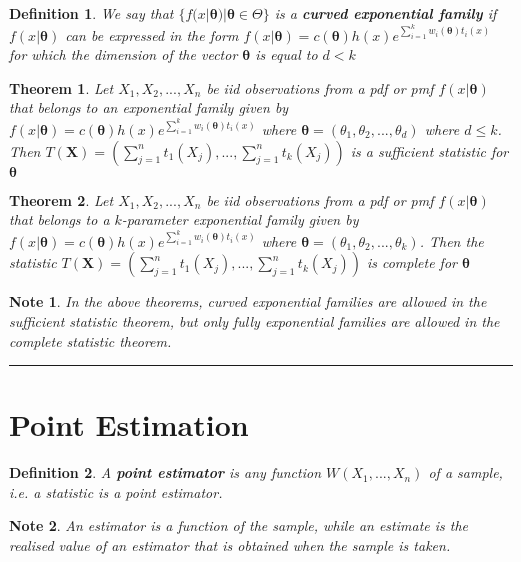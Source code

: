 \documentclass[14pt,twoside]{extreport}
\newcommand{\hhrule}{\vspace{1cm}\hrule\vspace{1cm}}
\theoremstyle{dotless}
\newtheorem*{defn}{\footnotesize Definition}
\newtheorem*{thm}{\footnotesize Theorem} %
\newtheorem*{note}{\footnotesize Note} %
\begin{document}
\begin{defn}
    We say that $\{ f(x|\bm{\theta}) | \bm{\theta} \in \Theta \}$ is a \textbf{curved exponential family} if $f(x|\bm{\theta})$ can be expressed in the form $f(x|\bm{\theta}) = c(\bm{\theta}) h(x) e^{\sum_{i=1}^k w_i(\bm{\theta}) t_i(x)}$ for which the dimension of the vector $\bm{\theta}$ is equal to $d < k$
\end{defn}

\begin{thm}
    Let $X_1, X_2, ...,  X_n$ be iid observations from a pdf or pmf $f(x|\bm{\theta})$ that belongs to an exponential family given by $f(x|\bm{\theta}) = c(\bm{\theta}) h(x) e^{\sum_{i=1}^k w_i(\bm{\theta}) t_i(x)}$ where $\bm{\theta} = (\theta_1, \theta_2, ..., \theta_d)$ where $d \leq k$. Then $T(\bm{X}) = \left (  \sum_{j=1}^n t_1(X_j), ..., \sum_{j=1}^n t_k(X_j) \right )$ is a sufficient statistic for $\bm{\theta}$
\end{thm}


\begin{thm}
    Let $X_1, X_2, ..., X_n$ be iid observations from a pdf or pmf $f(x|\bm{\theta})$ that belongs to a $k$-parameter exponential family given by $f(x|\bm{\theta}) = c(\bm{\theta}) h(x) e^{\sum_{i=1}^k w_i(\bm{\theta}) t_i(x)}$  where $\bm{\theta} = (\theta_1, \theta_2, ..., \theta_k)$. Then the statistic $T(\bm{X}) = \left ( \sum_{j=1}^n t_1(X_j), ..., \sum_{j=1}^n t_k(X_j) \right )$ is complete for $\bm{\theta}$
\end{thm}

\begin{note}
    In the above theorems, curved exponential families are allowed in the sufficient statistic theorem, but only fully exponential families are allowed in the complete statistic theorem.
\end{note}


\hhrule

\section*{Point Estimation}

\begin{defn}
A \textbf{point estimator} is any function $W(X_1, ..., X_n)$ of a sample, i.e. a statistic is a point estimator.
\end{defn}

\begin{note}
    An estimator is a function of the sample, while an estimate is the realised value of an estimator that is obtained when the sample is taken.
\end{note}
\end{document}
